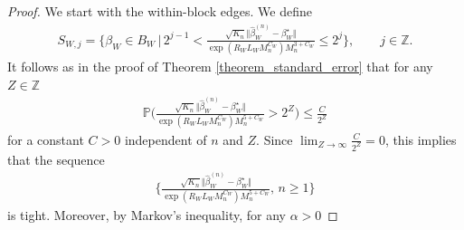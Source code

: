 \documentclass[10pt,a4paper]{amsart}
\begin{document}
\begin{proof}
We start with the within-block edges. We define 
\begin{align*}
    S_{W,j}= \bigg\{ \beta_W \in B_W \, \vert \, 2^{j-1} < \frac{\sqrt{K_n}\Vert \hat{\beta}_W^{(n)} - \beta_W^{\star} \Vert}{\exp(R_WL_WM_n^{C_W}) M_n^{3+C_W}} \leq 2^j \bigg\} , \qquad j \in \mathbb{Z}.
\end{align*}
It follows as in  the proof of Theorem \ref{theorem_standard_error} that for any $Z \in \mathbb{Z}$
\begin{align*}
    \mathbb{P}\bigg( \frac{\sqrt{K_n}\Vert \hat{\beta}_W^{(n)} - \beta_W^{\star} \Vert}{\exp(R_WL_WM_n^{C_W}) M_n^{5+C_W}} > 2^Z \bigg) \leq  \frac{C }{2^Z}
\end{align*}
for a constant $C  >0$ independent of $n$ and $Z$. Since $\lim_{Z \rightarrow \infty}    \frac{C}{2^Z}= 0$, this implies that the sequence 
\begin{align} \label{proof_as_norm_tight_seq}
    \bigg\{\frac{\sqrt{K_n}\Vert \hat{\beta}_W^{(n)} - \beta_W^{\star} \Vert}{\exp(R_WL_WM_n^{C_W}) M_n^{5+C_W}} , \, n \geq 1 \bigg\}
\end{align}
is tight. Moreover,  by Markov's inequality,   for any $\alpha>0$


\end{proof}
\end{document}
